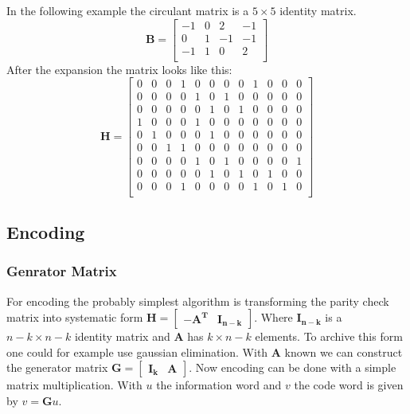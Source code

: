 In the following example the circulant matrix is a $5\times 5$ identity matrix. 
\begin{equation}
	\bm{B} = \left[\begin{matrix}
		-1 & 0 & 2 & -1\\
		0 & 1 & -1 & -1\\
		-1 & 1 & 0 & 2\\
	\end{matrix}\right]
\end{equation}
After the expansion the matrix looks like this:
\setcounter{MaxMatrixCols}{20}
\begin{equation}
	\bm{H} = \left[\begin{matrix}
		0 & 0 & 0 & 1 & 0 & 0 & 0 & 0 & 1 & 0 & 0 & 0 \\
		0 & 0 & 0 & 0 & 1 & 0 & 1 & 0 & 0 & 0 & 0 & 0 \\
		0 & 0 & 0 & 0 & 0 & 1 & 0 & 1 & 0 & 0 & 0 & 0 \\
		1 & 0 & 0 & 0 & 1 & 0 & 0 & 0 & 0 & 0 & 0 & 0 \\
		0 & 1 & 0 & 0 & 0 & 1 & 0 & 0 & 0 & 0 & 0 & 0 \\
		0 & 0 & 1 & 1 & 0 & 0 & 0 & 0 & 0 & 0 & 0 & 0 \\
		0 & 0 & 0 & 0 & 1 & 0 & 1 & 0 & 0 & 0 & 0 & 1 \\
		0 & 0 & 0 & 0 & 0 & 1 & 0 & 1 & 0 & 1 & 0 & 0 \\
		0 & 0 & 0 & 1 & 0 & 0 & 0 & 0 & 1 & 0 & 1 & 0 \\
	\end{matrix}\right]
\end{equation}

\subsection{Encoding}
\subsubsection{Genrator Matrix}
For encoding the probably simplest algorithm is transforming the parity check matrix into systematic form $\bm{H} = \left[\begin{matrix} \bm{-A^T} & \bm{I_{n-k}}\end{matrix}\right]$. Where $\bm{I_{n-k}}$ is a $n-k \times n - k$ identity matrix and $\bm{A}$ has $k \times n - k$ elements. To archive this form one could for example use gaussian elimination. With $\bm{A}$ known we can construct the generator matrix $\bm{G} = \left[\begin{matrix} \bm{I_{k}} & \bm{A} \end{matrix}\right]$. Now encoding can be done with a simple matrix multiplication. With $u$ the information word and $v$ the code word is given by $v = \bm{G}u$.


